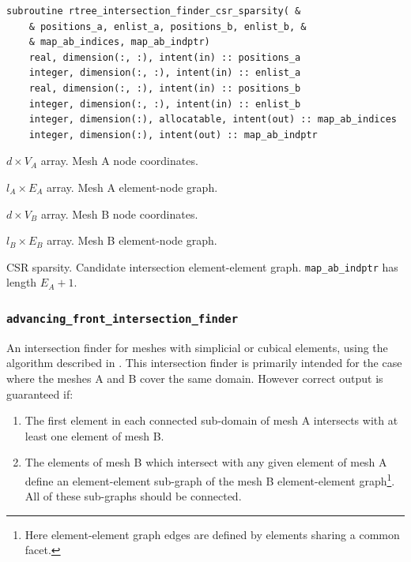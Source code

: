 \documentclass{article}
\begin{document}
\begin{lstlisting}[language=FORTRAN]
  subroutine rtree_intersection_finder_csr_sparsity( &
    & positions_a, enlist_a, positions_b, enlist_b, &
    & map_ab_indices, map_ab_indptr)
    real, dimension(:, :), intent(in) :: positions_a
    integer, dimension(:, :), intent(in) :: enlist_a
    real, dimension(:, :), intent(in) :: positions_b
    integer, dimension(:, :), intent(in) :: enlist_b
    integer, dimension(:), allocatable, intent(out) :: map_ab_indices
    integer, dimension(:), intent(out) :: map_ab_indptr
\end{lstlisting}

\begin{description}[font=\ttfamily\bfseries,leftmargin=2.2\parindent,labelindent=1.7\parindent,noitemsep]
  \item[positions\_a] $d \times V_A$ array. Mesh A node coordinates.
  \item[enlist\_a] $l_A \times E_A$ array. Mesh A element-node graph.
  \item[positions\_b] $d \times V_B$ array. Mesh B node coordinates.
  \item[enlist\_b] $l_B \times E_B$ array. Mesh B element-node graph.
  \item[map\_ab\_indices, map\_ab\_indptr] CSR sparsity. Candidate intersection
    element-element graph. \linebreak \verb+map_ab_indptr+ has length $E_A + 1$.
\end{description}

\subsubsection{\texttt{advancing\_front\_intersection\_finder}}

An intersection finder for meshes with simplicial or cubical elements, using
the algorithm described in \citet{farrell2011}
\citep[see also][]{gander2009,gander2013}. This intersection finder is primarily
intended for the case where the meshes A and B cover the same domain. However
correct output is guaranteed if:
\begin{enumerate}
  \item The first element in each connected sub-domain of mesh A intersects with
        at least one element of mesh B.
  \item The elements of mesh B which intersect with any given element of mesh A
        define an element-element sub-graph of the mesh B element-element
        graph\footnote{Here element-element graph edges are defined by elements
        sharing a common facet.}. All of these sub-graphs should be connected. 
\end{enumerate}
\end{document}
